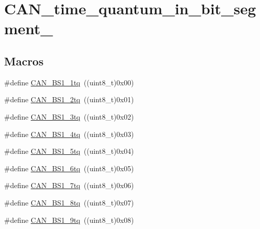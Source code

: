 \hypertarget{group___c_a_n__time__quantum__in__bit__segment__1}{\section{C\-A\-N\-\_\-time\-\_\-quantum\-\_\-in\-\_\-bit\-\_\-segment\-\_}
\label{group___c_a_n__time__quantum__in__bit__segment__1}
}
\subsection*{Macros}
\begin{DoxyCompactItemize}
\item 
\#define \hyperlink{group___c_a_n__time__quantum__in__bit__segment__1_ga76b8fb0815b7a3f398fffe72dda0bc04}{C\-A\-N\-\_\-\-B\-S1\-\_\-1tq}~((uint8\-\_\-t)0x00)
\item 
\#define \hyperlink{group___c_a_n__time__quantum__in__bit__segment__1_ga1544ecf902e6173859d60cff9530971a}{C\-A\-N\-\_\-\-B\-S1\-\_\-2tq}~((uint8\-\_\-t)0x01)
\item 
\#define \hyperlink{group___c_a_n__time__quantum__in__bit__segment__1_gaa808099663480de935d3ce9187c2dcab}{C\-A\-N\-\_\-\-B\-S1\-\_\-3tq}~((uint8\-\_\-t)0x02)
\item 
\#define \hyperlink{group___c_a_n__time__quantum__in__bit__segment__1_ga7c5c668200f41991e14b31ca20235000}{C\-A\-N\-\_\-\-B\-S1\-\_\-4tq}~((uint8\-\_\-t)0x03)
\item 
\#define \hyperlink{group___c_a_n__time__quantum__in__bit__segment__1_ga31dea95492dababfcf79bcaeb884b99e}{C\-A\-N\-\_\-\-B\-S1\-\_\-5tq}~((uint8\-\_\-t)0x04)
\item 
\#define \hyperlink{group___c_a_n__time__quantum__in__bit__segment__1_gaa7fc6fcdf9c1c70ee9700b35e32e205e}{C\-A\-N\-\_\-\-B\-S1\-\_\-6tq}~((uint8\-\_\-t)0x05)
\item 
\#define \hyperlink{group___c_a_n__time__quantum__in__bit__segment__1_gafec90578d657073a671b6326f3bfcf8e}{C\-A\-N\-\_\-\-B\-S1\-\_\-7tq}~((uint8\-\_\-t)0x06)
\item 
\#define \hyperlink{group___c_a_n__time__quantum__in__bit__segment__1_ga1049ea9bc5b3da680574ca444e888de4}{C\-A\-N\-\_\-\-B\-S1\-\_\-8tq}~((uint8\-\_\-t)0x07)
\item 
\#define \hyperlink{group___c_a_n__time__quantum__in__bit__segment__1_ga0493701bdd73a9649510f035439a6580}{C\-A\-N\-\_\-\-B\-S1\-\_\-9tq}~((uint8\-\_\-t)0x08)

\end{DoxyCompactItemize}
